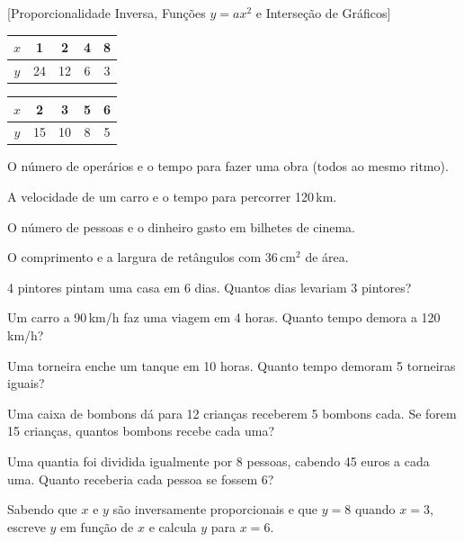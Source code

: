 \documentclass[12pt]{article}
\begin{document}
[Proporcionalidade Inversa, Funções $y = ax^2$ e Interseção de Gráficos]


\begin{exercicios}
  \item \begin{tabular}[c]{|c|c|c|c|c|}\hline
    $x$ & 1 & 2 & 4 & 8 \\\hline
    $y$ & 24 & 12 & 6 & 3 \\\hline
  \end{tabular}
  \item \begin{tabular}[c]{|c|c|c|c|c|}\hline
    $x$ & 2 & 3 & 5 & 6 \\\hline
    $y$ & 15 & 10 & 8 & 5 \\\hline
  \end{tabular}
  \item O número de operários e o tempo para fazer uma obra (todos ao mesmo ritmo).
  \item A velocidade de um carro e o tempo para percorrer 120\,km.
  \item O número de pessoas e o dinheiro gasto em bilhetes de cinema.
  \item O comprimento e a largura de retângulos com 36\,cm$^2$ de área.
\end{exercicios}

\begin{exercicios}
  \item 4 pintores pintam uma casa em 6 dias. Quantos dias levariam 3 pintores?
  \item Um carro a 90\,km/h faz uma viagem em 4 horas. Quanto tempo demora a 120\,km/h?
  \item Uma torneira enche um tanque em 10 horas. Quanto tempo demoram 5 torneiras iguais?
  \item Uma caixa de bombons dá para 12 crianças receberem 5 bombons cada. Se forem 15 crianças, quantos bombons recebe cada uma?
  \item Uma quantia foi dividida igualmente por 8 pessoas, cabendo 45 euros a cada uma. Quanto receberia cada pessoa se fossem 6?
  \item Sabendo que $x$ e $y$ são inversamente proporcionais e que $y = 8$ quando $x = 3$, escreve $y$ em função de $x$ e calcula $y$ para $x = 6$.
\end{exercicios}
\end{document}
